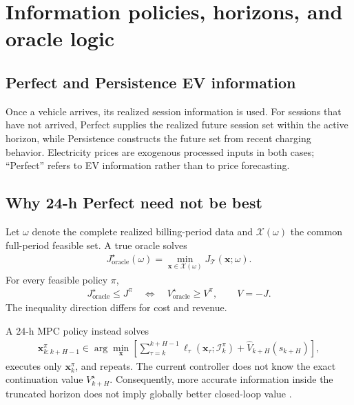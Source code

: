 \documentclass[final,5p,times]{elsarticle}
\newcommand{\calT}{\mathcal{T}}
\begin{document}
\section{Information policies, horizons, and oracle logic}
\label{sec:oracle_logic}

\subsection{Perfect and Persistence EV information}
Once a vehicle arrives, its realized session information is used. For sessions
that have not arrived, Perfect supplies the realized future session set within
the active horizon, while Persistence constructs the future set from recent
charging behavior. Electricity prices are exogenous processed inputs in both
cases; ``Perfect'' refers to EV information rather than to price forecasting.

\subsection{Why 24-h Perfect need not be best}
Let $\omega$ denote the complete realized billing-period data and
$\mathcal{X}(\omega)$ the common full-period feasible set. A true oracle solves
\begin{align}
J_{\mathrm{oracle}}^\star(\omega)
=\min_{\boldsymbol{x}\in\mathcal{X}(\omega)}
J_{\calT}(\boldsymbol{x};\omega). \label{eq:oracle}
\end{align}
For every feasible policy $\pi$,
\begin{align}
J_{\mathrm{oracle}}^\star\le J^\pi
\quad\Longleftrightarrow\quad
V_{\mathrm{oracle}}^\star\ge V^\pi,\qquad V=-J. \label{eq:oracle_dominance}
\end{align}
The inequality direction differs for cost and revenue.

A 24-h MPC policy instead solves
\begin{align}
\boldsymbol{x}_{k:k+H-1}^{\pi}\in
\arg\min_{\boldsymbol{x}}
\left[
\sum_{\tau=k}^{k+H-1}\ell_\tau
(\boldsymbol{x}_\tau;\mathcal{I}_k^\pi)
+\widehat V_{k+H}(s_{k+H})
\right], \label{eq:mpc}
\end{align}
executes only $\boldsymbol{x}_k^\pi$, and repeats. The current controller does
not know the exact continuation value $V_{k+H}^\star$. Consequently, more
accurate information inside the truncated horizon does not imply globally
better closed-loop value \cite{rawlings2017mpc}.
\end{document}
